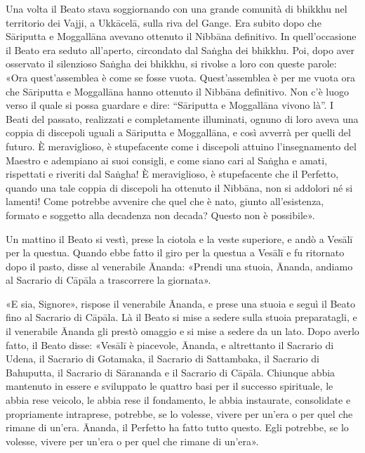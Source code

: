 
Una volta il Beato stava soggiornando con una grande comunità di bhikkhu nel
territorio dei Vajji, a Ukkācelā, sulla riva del Gange. Era subito dopo che
Sāriputta e Moggallāna avevano ottenuto il Nibbāna definitivo. In
quell’occasione il Beato era seduto all’aperto, circondato dal Saṅgha dei
bhikkhu. Poi, dopo aver osservato il silenzioso Saṅgha dei bhikkhu, si rivolse a
loro con queste parole: «Ora quest’assemblea è come se fosse vuota.
Quest’assemblea è per me vuota ora che Sāriputta e Moggallāna hanno ottenuto il
Nibbāna definitivo. Non c’è luogo verso il quale si possa guardare e dire:
“Sāriputta e Moggallāna vivono là”. I Beati del passato, realizzati e
completamente illuminati, ognuno di loro aveva una coppia di discepoli uguali a
Sāriputta e Moggallāna, e così avverrà per quelli del futuro. È meraviglioso, è
stupefacente come i discepoli attuino l’insegnamento del Maestro e adempiano ai
suoi consigli, e come siano cari al Saṅgha e amati, rispettati e riveriti dal
Saṅgha! È meraviglioso, è stupefacente che il Perfetto, quando una tale coppia
di discepoli ha ottenuto il Nibbāna, non si addolori né si lamenti! Come
potrebbe avvenire che quel che è nato, giunto all’esistenza, formato e soggetto
alla decadenza non decada? Questo non è possibile».


Un mattino il Beato si vestì, prese la ciotola e la veste superiore, e andò a
Vesālī per la questua. Quando ebbe fatto il giro per la questua a Vesālī e fu
ritornato dopo il pasto, disse al venerabile Ānanda: «Prendi una stuoia, Ānanda,
andiamo al Sacrario di Cāpāla a trascorrere la giornata».

«E sia, Signore», rispose il venerabile Ānanda, e prese una stuoia e seguì il
Beato fino al Sacrario di Cāpāla. Là il Beato si mise a sedere sulla stuoia
preparatagli, e il venerabile Ānanda gli prestò omaggio e si mise a sedere da un
lato. Dopo averlo fatto, il Beato disse: «Vesālī è piacevole, Ānanda, e
altrettanto il Sacrario di Udena, il Sacrario di Gotamaka, il Sacrario di
Sattambaka, il Sacrario di Bahuputta, il Sacrario di Sārananda e il Sacrario di
Cāpāla. Chiunque abbia mantenuto in essere e sviluppato le quattro basi per il
successo spirituale, le abbia rese veicolo, le abbia rese il fondamento, le
abbia instaurate, consolidate e propriamente intraprese, potrebbe, se lo
volesse, vivere per un’era o per quel che rimane di un’era. Ānanda, il Perfetto
ha fatto tutto questo. Egli potrebbe, se lo volesse, vivere per un’era o per
quel che rimane di un’era».

